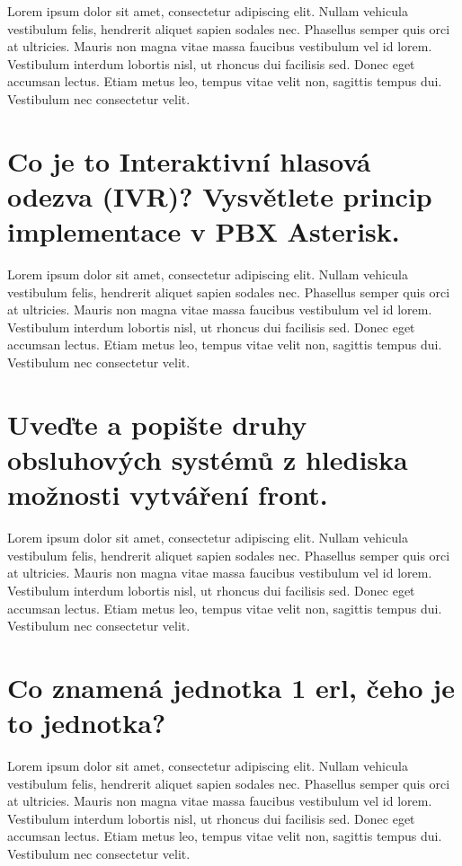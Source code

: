 Lorem ipsum dolor sit amet, consectetur adipiscing elit. Nullam vehicula vestibulum felis, hendrerit aliquet sapien sodales nec. Phasellus semper quis orci at ultricies. Mauris non magna vitae massa faucibus vestibulum vel id lorem. Vestibulum interdum lobortis nisl, ut rhoncus dui facilisis sed. Donec eget accumsan lectus. Etiam metus leo, tempus vitae velit non, sagittis tempus dui. Vestibulum nec consectetur velit.

\section{Co je to Interaktivní hlasová odezva (IVR)? Vysvětlete princip implementace v PBX Asterisk.}

Lorem ipsum dolor sit amet, consectetur adipiscing elit. Nullam vehicula vestibulum felis, hendrerit aliquet sapien sodales nec. Phasellus semper quis orci at ultricies. Mauris non magna vitae massa faucibus vestibulum vel id lorem. Vestibulum interdum lobortis nisl, ut rhoncus dui facilisis sed. Donec eget accumsan lectus. Etiam metus leo, tempus vitae velit non, sagittis tempus dui. Vestibulum nec consectetur velit.

\section{Uveďte a popište druhy obsluhových systémů z hlediska možnosti vytváření front.}

Lorem ipsum dolor sit amet, consectetur adipiscing elit. Nullam vehicula vestibulum felis, hendrerit aliquet sapien sodales nec. Phasellus semper quis orci at ultricies. Mauris non magna vitae massa faucibus vestibulum vel id lorem. Vestibulum interdum lobortis nisl, ut rhoncus dui facilisis sed. Donec eget accumsan lectus. Etiam metus leo, tempus vitae velit non, sagittis tempus dui. Vestibulum nec consectetur velit.

\section{Co znamená jednotka 1 erl, čeho je to jednotka?}

Lorem ipsum dolor sit amet, consectetur adipiscing elit. Nullam vehicula vestibulum felis, hendrerit aliquet sapien sodales nec. Phasellus semper quis orci at ultricies. Mauris non magna vitae massa faucibus vestibulum vel id lorem. Vestibulum interdum lobortis nisl, ut rhoncus dui facilisis sed. Donec eget accumsan lectus. Etiam metus leo, tempus vitae velit non, sagittis tempus dui. Vestibulum nec consectetur velit.

